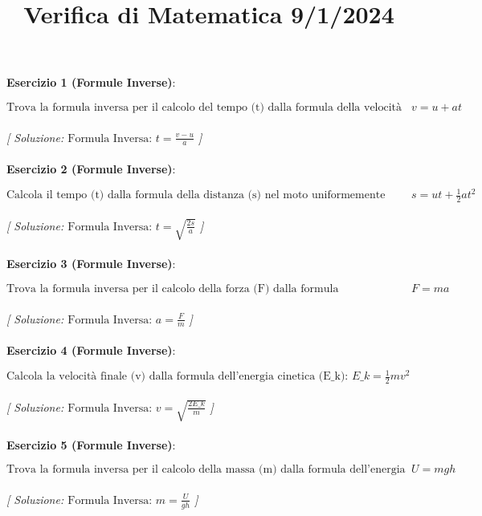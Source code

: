 \documentclass{article}
\title{\raggedright Verifica di Matematica  9/1/2024}
\date{}
\begin{document}
\maketitle

\textbf{Esercizio 1 (Formule Inverse)}:\\
\par $\text{Trova la formula inversa per il calcolo del tempo (t) dalla formula della velocit\`a (v) nel moto uniformemente accelerato: } v = u + at$ \\\\

\textit{[ Soluzione: $\text{Formula Inversa: } t = \frac{v - u}{a}$ ]}\\\\

\textbf{Esercizio 2 (Formule Inverse)}:\\
\par $\text{Calcola il tempo (t) dalla formula della distanza (s) nel moto uniformemente accelerato: } s = ut + \frac{1}{2}at^2$ \\\\

\textit{[ Soluzione: $\text{Formula Inversa: } t = \sqrt{\frac{2s}{a}}$ ]}\\\\

\textbf{Esercizio 3 (Formule Inverse)}:\\
\par $\text{Trova la formula inversa per il calcolo della forza (F) dalla formula dell'accelerazione (a) nel secondo principio della dinamica: } F = ma$ \\\\

\textit{[ Soluzione: $\text{Formula Inversa: } a = \frac{F}{m}$ ]}\\\\

\textbf{Esercizio 4 (Formule Inverse)}:\\
\par $\text{Calcola la velocit\`a finale (v) dalla formula dell'energia cinetica (E\_k): } E\_k = \frac{1}{2}mv^2$ \\\\

\textit{[ Soluzione: $\text{Formula Inversa: } v = \sqrt{\frac{2E\_k}{m}}$ ]}\\\\

\textbf{Esercizio 5 (Formule Inverse)}:\\
\par $\text{Trova la formula inversa per il calcolo della massa (m) dalla formula dell'energia potenziale gravitazionale (U): } U = mgh$ \\\\

\textit{[ Soluzione: $\text{Formula Inversa: } m = \frac{U}{gh}$ ]}\\\\
\end{document}
